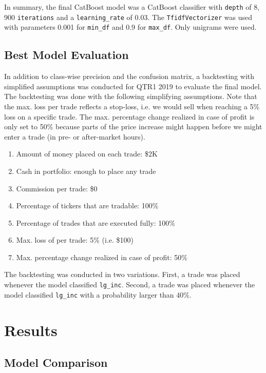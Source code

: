 \documentclass{article}
\begin{document}
	In summary, the final CatBoost model was a CatBoost classifier with \lstinline{depth} of 8, 900 \lstinline{iterations} and a \lstinline{learning_rate} of 0.03. The \lstinline{TfidfVectorizer} was used with parameters 0.001 for \lstinline{min_df} and 0.9 for \lstinline{max_df}. Only unigrams were used.
	

	\subsection{Best Model Evaluation}
	
	In addition to class-wise precision and the confusion matrix, a backtesting with simplified assumptions was conducted for QTR1 2019 to evaluate the final model. The backtesting was done with the following simplifying assumptions. Note that the max. loss per trade reflects a stop-loss, i.e. we would sell when reaching a 5\% loss on a specific trade. The max. percentage change realized in case of profit is only set to 50\% because parts of the price increase might happen before we might enter a trade (in pre- or after-market hours).
	
	\begin{enumerate}
		\item 	Amount of money placed on each trade: \$2K
		\item 	Cash in portfolio: enough to place any trade
		\item 	Commission per trade: \$0
		\item 	Percentage of tickers that are tradable: 100\%
		\item 	Percentage of trades that are executed fully: 100\%
		\item 	Max. loss of per trade: 5\% (i.e. \$100)
		\item 	Max. percentage change realized in case of profit: 50\%
	\end{enumerate}
	
	The backtesting was conducted in two variations. First, a trade was placed whenever the model classified \lstinline{lg_inc}. Second, a trade was placed whenever the model classified \lstinline{lg_inc} with a probability larger than 40\%.
	
	\section{Results}
	
	\subsection{Model Comparison}
\end{document}
